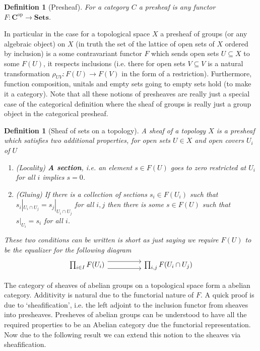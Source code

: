 \documentclass[12pt]{article}
\numberwithin{equation}{section}
\newcounter{dummy} \numberwithin{dummy}{section}
\newtheorem{definition}[dummy]{Definition}
\begin{document}
\begin{appendices}
\begin{enumerate}
		\begin{definition}[Presheaf]
			For a category $C$ a presheaf is any functor $F: \mathbf{C}^{\mathrm{op}}\to \mathbf{Sets}$.
		\end{definition}
		In particular in the case for a topological space $X$ a presheaf of groups (or any algebraic object) on $X$ (in truth the set of the lattice of open sets of $X$ ordered by inclusion) is a some contravariant functor $F$ which sends open sets $U \subseteq X$ to some $F(U)$, it respects inclusions (i.e. there for open sets $V \subseteq V $ is a natural transformation $\rho_{UV}: F(U)\to F(V)$ in the form of a restriction). Furthermore, function composition, unitals and empty sets going to empty sets hold (to make it a category). Note that all these notions of presheaves are really just a special case of the categorical definition where the sheaf of groups is really just a group object in the categorical presheaf.
		\begin{definition}[Sheaf of sets on a topology]\label{def:scheaf}
			A sheaf of a topology $X$ is a presheaf which satisfies two additional properties, for open sets $U \in X$ and open covers ${U_i}$ of $U$
			\begin{enumerate}
				\item (Locality)  \textbf{A section}, i.e. an element $s \in F(U)$ goes to zero restricted at $U_i$ for all $i$ implies $s=0$.
				\item (Gluing) If there is a collection of sections $s_i \in F(U_i)$ such that $s_i|_{U_i \cap U_j}=s_j|_{U_i \cap U_j}$ for all $i,j$ then there is some $s \in F(U)$ such that $s|_{U_i}=s_i$ for all $i$.
			\end{enumerate}
			
			These two conditions can be written is short as just saying we require $F(U)$ to be the equalizer for the following diagram
			\[\begin{tikzcd}
				{\prod_{i \in I} F(U_i)} && {\prod_{i,j}F(U_i \cap U_j)}
				\arrow[shift right=2, from=1-1, to=1-3]
				\arrow[shift left=2, from=1-1, to=1-3]
			\end{tikzcd}\]
		\end{definition}
		
		The category of sheaves of abelian groups on a topological space form a abelian category. Additivity is natural due to the functorial nature of $F$. A quick proof is due to `sheafification', i.e. the left adjoint to the inclusion functor from sheaves into presheaves. Presheves of abelian groups can be understood to have all the required properties to be an Abelian category due the functorial representation. Now due to the following result \cite[Sec. 6.17]{stacks1} we can extend this notion to the sheaves via sheafification.
	\end{enumerate}

\end{appendices}
\end{document}
